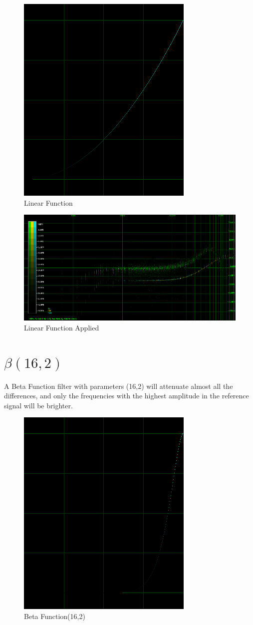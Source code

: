 \documentclass[10pt,a4paper]{report}
\begin{document}
\begin{appendices}
\begin{figure}[H]
	\centering
	\includegraphics[width=0.4\linewidth]{plots/BetaFunctionPlot_4.png}
	\caption[Linear]{Linear Function}
	\label{fig:betafunctionplot4}
\end{figure}

\begin{figure}[H]
	\centering
	\includegraphics[width=1\linewidth]{plots/BetaFunctionPlot_4_Data.png}
	\caption[Linear Applied]{Linear Function Applied}
	\label{fig:betafunctionplot4data}
\end{figure}

\newpage
\section{$\beta(16,2)$} 

A Beta Function filter with parameters (16,2) will attenuate almost all the differences, and only the frequencies with the highest amplitude in the reference signal will be brighter.

\begin{figure}[H]
	\centering
	\includegraphics[width=0.4\linewidth]{plots/BetaFunctionPlot_5.png}
	\caption[Beta Function(16,2)]{Beta Function(16,2)}
	\label{fig:betafunctionplot5}
\end{figure}


\end{appendices}
\end{document}
